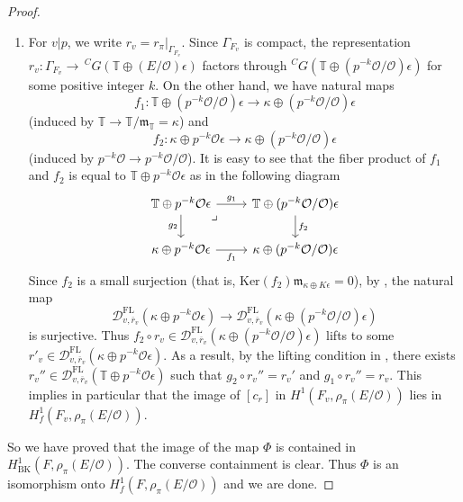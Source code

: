 \documentclass[12pt,oneside,reqno]{amsart}
\theoremstyle{plain}
\begin{document}
\begin{proof}
\begin{enumerate}
			\item 
			For $v|p$, we write $r_v=r_\pi|_{\Gamma_{F_v}}$. Since $\Gamma_{F_v}$ is compact, the representation $r_v\colon\Gamma_{F_v}\to\,^CG(\mathbb{T}\oplus(E/\mathcal{O})\epsilon)$ factors through $^CG(\mathbb{T}\oplus(p^{-k}\mathcal{O}/\mathcal{O})\epsilon)$ for some positive integer $k$. On the other hand, 
			we have natural maps
			\[
			f_1\colon\mathbb{T}\oplus(p^{-k}\mathcal{O}/\mathcal{O})\epsilon\to\kappa\oplus(p^{-k}\mathcal{O}/\mathcal{O})\epsilon
			\]
			(induced by $\mathbb{T}\to\mathbb{T}/\mathfrak{m}_\mathbb{T}=\kappa$) and
			\[
			f_2\colon\kappa\oplus p^{-k}\mathcal{O}\epsilon\to\kappa\oplus(p^{-k}\mathcal{O}/\mathcal{O})\epsilon
			\]
			(induced by $p^{-k}\mathcal{O}\to p^{-k}\mathcal{O}/\mathcal{O}$). It is easy to see that the fiber product of $f_1$ and $f_2$ is equal to $\mathbb{T}\oplus p^{-k}\mathcal{O}\epsilon$ as in the following diagram
			\[
			\begin{tikzcd}
				\mathbb{T}\oplus p^{-k}\mathcal{O}\epsilon
				\arrow[r, "g_1"]
				\arrow[d, "g_2"']
				\arrow[dr, phantom, "\lrcorner", very near start]
				&
				\mathbb{T}\oplus(p^{-k}\mathcal{O}/\mathcal{O})\epsilon
				\arrow[d, "f_2"]
				\\
				\kappa\oplus p^{-k}\mathcal{O}\epsilon
				\arrow[r, "f_1"']
				&
				\kappa\oplus(p^{-k}\mathcal{O}/\mathcal{O})\epsilon
			\end{tikzcd}
			\]
			Since $f_2$ is a small surjection (that is, $\mathrm{Ker}(f_2)\mathfrak{m}_{\kappa\oplus K\epsilon}=0$), by \cite[Proposition 5.8]{Booher2019}, the natural map
			\[
			\mathcal{D}_{v,\overline{r}_v}^\mathrm{FL}(\kappa\oplus p^{-k}\mathcal{O}\epsilon)
			\to
			\mathcal{D}_{v,\overline{r}_v}^\mathrm{FL}(\kappa\oplus (p^{-k}\mathcal{O}/\mathcal{O})\epsilon)
			\]
			is surjective. 
			Thus $f_2\circ r_v\in\mathcal{D}_{v,\overline{r}_v}^\mathrm{FL}(\kappa\oplus(p^{-k}\mathcal{O}/\mathcal{O})\epsilon)$ lifts to some $r'_v\in\mathcal{D}_{v,\overline{r}_v}^\mathrm{FL}(\kappa\oplus p^{-k}\mathcal{O}\epsilon)$. As a result, by the lifting condition in \cite[§2.2]{Booher2019}, there exists $r_v''\in\mathcal{D}_{v,\overline{r}_v}^\mathrm{FL}(\mathbb{T}\oplus p^{-k}\mathcal{O}\epsilon)$ such that $g_2\circ r_v''=r_v'$ and $g_1\circ r_v''=r_v$.
			This implies in particular that the image of $[c_r]$ in $H^1(F_v,\rho_\pi(E/\mathcal{O}))$ lies in $H_f^1(F_v,\rho_\pi(E/\mathcal{O}))$.
		\end{enumerate}
		
		
		
		
		
		
		
		So we have proved that the image of the map $\Phi$ is contained in $H^1_\mathrm{BK}(F,\rho_\pi(E/\mathcal{O}))$. The converse containment is clear. Thus $\Phi$ is an isomorphism onto $H^1_f(F,\rho_\pi(E/\mathcal{O}))$ and we are done.
	\end{proof}
	
\end{document}
